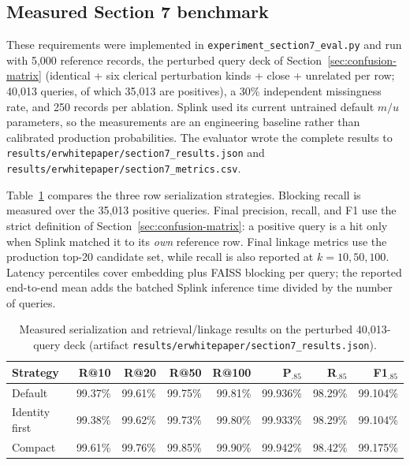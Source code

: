 \documentclass[11pt]{article}
\begin{document}
\subsection{Measured Section 7 benchmark}
These requirements were implemented in \texttt{experiment\_section7\_eval.py} and run with 5,000 reference records, the perturbed query deck of Section~\ref{sec:confusion-matrix} (identical + six clerical perturbation kinds + close + unrelated per row; 40,013 queries, of which 35,013 are positives), a 30\% independent missingness rate, and 250 records per ablation. Splink used its current untrained default $m/u$ parameters, so the measurements are an engineering baseline rather than calibrated production probabilities. The evaluator wrote the complete results to \texttt{results/erwhitepaper/section7\_results.json} and \texttt{results/erwhitepaper/section7\_metrics.csv}.

Table~\ref{tab:section7-strategies} compares the three row serialization strategies. Blocking recall is measured over the 35,013 positive queries. Final precision, recall, and F1 use the strict definition of Section~\ref{sec:confusion-matrix}: a positive query is a hit only when Splink matched it to its \emph{own} reference row. Final linkage metrics use the production top-20 candidate set, while recall is also reported at $k=10,50,100$. Latency percentiles cover embedding plus FAISS blocking per query; the reported end-to-end mean adds the batched Splink inference time divided by the number of queries.

\begin{table}[h]
\centering
\caption{Measured serialization and retrieval/linkage results on the perturbed 40{,}013-query deck (artifact \texttt{results/erwhitepaper/section7\_results.json}).}
\label{tab:section7-strategies}
\small
\begin{tabular}{lrrrrrrr}
\toprule
Strategy & R@10 & R@20 & R@50 & R@100 & P$_{.85}$ & R$_{.85}$ & F1$_{.85}$ \\
\midrule
Default & 99.37\% & 99.61\% & 99.75\% & 99.81\% & 99.936\% & 98.29\% & 99.104\% \\
Identity first & 99.38\% & 99.62\% & 99.73\% & 99.80\% & 99.933\% & 98.29\% & 99.104\% \\
Compact & 99.61\% & 99.76\% & 99.85\% & 99.90\% & 99.942\% & 98.42\% & 99.175\% \\
\bottomrule
\end{tabular}
\end{table}
\end{document}
